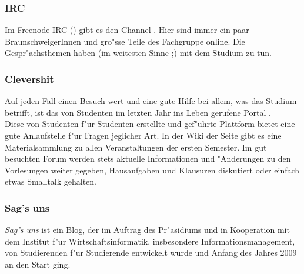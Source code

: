 
\subsubsection*{IRC}

Im Freenode IRC () gibt es den Channel . Hier
sind immer ein paar BraunschweigerInnen und gro"sse Teile des Fachgruppe online. Die Gespr"achsthemen haben (im weitesten
Sinne ;) mit dem Studium zu tun.

\subsubsection*{Clevershit}

Auf jeden Fall einen Besuch wert und eine gute Hilfe bei allem, was das Studium betrifft, ist das von Studenten im letzten Jahr ins Leben gerufene Portal \mbox{}.\\
Diese von Studenten f"ur Studenten erstellte und gef"uhrte Plattform bietet eine gute Anlaufstelle f"ur Fragen jeglicher Art. In der Wiki der Seite gibt es eine Materialsammlung zu allen Veranstaltungen der ersten Semester. Im gut besuchten Forum werden stets aktuelle Informationen und "Anderungen zu den Vorlesungen weiter gegeben, Hausaufgaben und Klausuren diskutiert oder einfach etwas Smalltalk gehalten.

\subsubsection*{Sag's uns}
\emph{Sag's uns} ist ein Blog, der im Auftrag des Pr"asidiums und in Kooperation mit dem Institut f"ur Wirtschaftsinformatik, insbesondere Informationsmanagement, von Studierenden f"ur Studierende entwickelt wurde und Anfang des Jahres 2009 an den Start ging.

